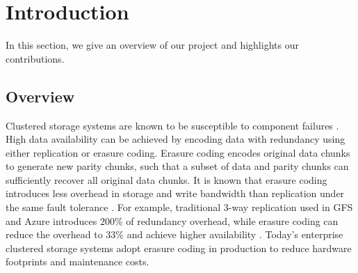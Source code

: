 \chapter{Introduction}
\label{sec:introduction}

In this section, we give an overview of our project and highlights our
contributions.

\section{Overview}

Clustered storage systems are known to be susceptible to component failures
\cite{ghemawat03}.  High data availability can be achieved by encoding data
with redundancy using either replication or erasure coding.  Erasure coding
encodes original data chunks to generate new parity chunks, such that a subset
of data and parity chunks can sufficiently recover all original data chunks.
It is known that erasure coding introduces less overhead in storage and write
bandwidth than replication under the same fault tolerance
\cite{weatherspoon02,rodrigues05}.  For example, traditional 3-way replication
used in GFS \cite{ghemawat03} and Azure \cite{calder11} introduces 200\% of
redundancy overhead, while erasure coding can reduce the overhead to 33\%
and achieve higher availability \cite{huang12}.  Today's enterprise
clustered storage systems
\cite{welch08,ford10,huang12,sathiamoorthy13,resch11} adopt erasure coding in
production to reduce hardware footprints and maintenance costs.

